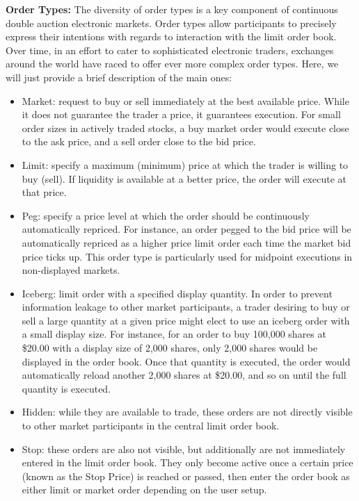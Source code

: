 \noindent\textbf{Order Types:} The diversity of order types is a key component of continuous double auction electronic markets. Order types allow participants to precisely express their intentions with regards to interaction with the limit order book. Over time, in an effort to cater to sophisticated electronic traders, exchanges around the world have raced to offer ever more complex order types. Here, we will just provide a brief description of the main ones:
\begin{itemize}
\item  Market: request to buy or sell immediately at the best available price. While it does not guarantee the trader a price, it guarantees execution. For small order sizes in actively traded stocks, a buy market order would execute close to the ask price, and a sell order close to the bid price.

\item  Limit: specify a maximum (minimum) price at which the trader is willing to buy (sell). If liquidity is available at a better price, the order will execute at that price.

\item  Peg: specify a price level at which the order should be continuously automatically repriced. For instance, an order pegged to the bid price will be automatically repriced as a higher price limit order each time the market bid price ticks up. This order type is particularly used for midpoint executions in non-displayed markets.

\item  Iceberg: limit order with a specified display quantity. In order to prevent information leakage to other market participants, a trader desiring to buy or sell a large quantity at a given price might elect to use an iceberg order with a small display size. For instance, for an order to buy 100,000 shares at \$20.00 with a display size of 2,000 shares, only 2,000 shares would be displayed in the order book. Once that quantity is executed, the order would automatically reload another 2,000 shares at \$20.00, and so on until the full quantity is executed.

\item  Hidden: while they are available to trade, these orders are not directly visible to other market participants in the central limit order book. 

\item  Stop: these orders are also not visible, but additionally are not immediately entered in the limit order book. They only become active once a certain price (known as the Stop Price) is reached or passed, then enter the order book as either limit or market order depending on the user setup.


\end{itemize}

